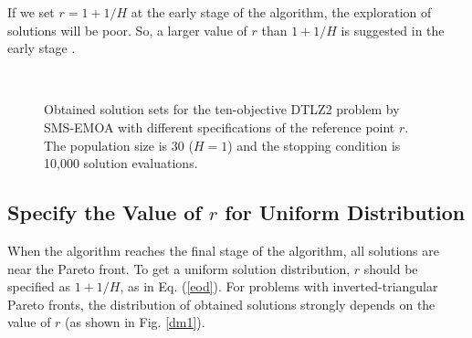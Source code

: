 \documentclass[conference]{IEEEtran}
\begin{document}
If we set $r = 1+1/H$ at the early stage of the algorithm, the exploration of solutions will be poor. 
So, a larger value of $r$ than $1+1/H$ is suggested in the early stage \cite{hisao:dynamic}. 
\begin{figure}[!t]
  \centering
  \quad
  \\
  \caption{Obtained solution sets for the ten-objective DTLZ2 problem by SMS-EMOA 
  with different specifications of the reference point $r$. The population size is 30 ($H = 1$) and the stopping condition is 10,000 solution evaluations. 
  }
  \label{nud}
\end{figure} 

\subsection{Specify the Value of $r$ for Uniform Distribution}
When the algorithm reaches the final stage of the algorithm, all solutions are near the Pareto front. 
To get a uniform solution distribution, $r$ should be specified as $1+1/H$, as in Eq. (\ref{eod}). 
For problems with inverted-triangular Pareto fronts, the distribution of obtained solutions 
strongly depends on the value of $r$ (as shown in Fig. \ref{dm1}). 
\end{document}
